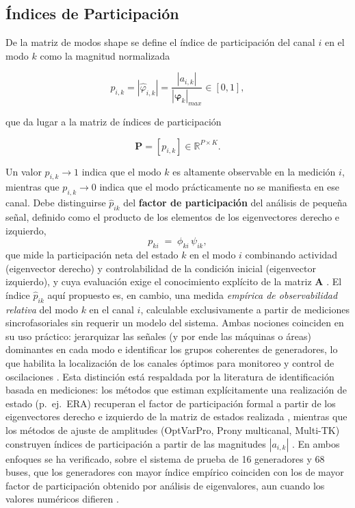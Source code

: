 \subsection{Índices de Participación}

De la matriz de modos shape se define el índice de participación del canal $i$ en el modo $k$ como la magnitud normalizada

\begin{equation}
p_{i,k} = |\hat{\varphi}_{i,k}| = \frac{|a_{i,k}|}{|\boldsymbol{\varphi}_k|_{max}} \in [0,1],
\label{eq:participacion}
\end{equation}

que da lugar a la matriz de índices de participación

\begin{equation}
\mathbf{P} = [p_{i,k}] \in \mathbb{R}^{P \times K}.
\label{eq:matriz_participacion}
\end{equation}

Un valor $p_{i,k} \to 1$ indica que el modo $k$ es altamente observable en la medición $i$, 
mientras que $p_{i,k} \to 0$ indica que el modo prácticamente no se manifiesta en ese canal.
Debe distinguirse $\hat{p}_{ik}$ del \textbf{factor de participación} del
análisis de pequeña señal, definido como el producto de los elementos de
los eigenvectores derecho e izquierdo,
\begin{equation}
    p_{ki} \;=\; \phi_{ki}\,\psi_{ik},
    \label{eq:participation_state}
\end{equation}
que mide la participación neta del estado $k$ en el modo $i$ combinando
actividad (eigenvector derecho) y controlabilidad de la condición inicial
(eigenvector izquierdo), y cuya evaluación exige el conocimiento explícito
de la matriz $\mathbf{A}$ \cite{kundur1994}. El índice $\hat{p}_{ik}$ aquí
propuesto es, en cambio, una medida \textit{empírica de observabilidad
relativa} del modo $k$ en el canal $i$, calculable exclusivamente a partir
de mediciones sincrofasoriales sin requerir un modelo del sistema. Ambas
nociones coinciden en su uso práctico: jerarquizar las señales (y por ende
las máquinas o áreas) dominantes en cada modo e identificar los grupos
coherentes de generadores, lo que habilita la localización de los canales
óptimos para monitoreo y control de oscilaciones \cite{sauer2017}. Esta
distinción está respaldada por la literatura de identificación basada en
mediciones: los métodos que estiman explícitamente una realización de
estado (p.~ej.\ ERA) recuperan el factor de participación formal a partir
de los eigenvectores derecho e izquierdo de la matriz de estados
realizada \cite{li2020era}, mientras que los métodos de ajuste de
amplitudes (OptVarPro, Prony multicanal, Multi-TK) construyen índices de
participación a partir de las magnitudes $|a_{i,k}|$
\cite{jiang2021}. En ambos enfoques se ha verificado, sobre el sistema de
prueba de 16 generadores y 68 buses, que los generadores con mayor índice
empírico coinciden con los de mayor factor de participación obtenido por
análisis de eigenvalores, aun cuando los valores numéricos difieren
\cite{jiang2021,li2020era}.

